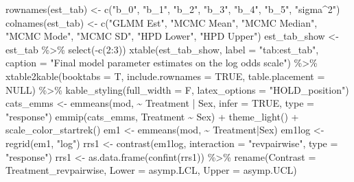 \documentclass[12pt]{article}
\newenvironment{Shaded}{\begin{snugshade}}{\end{snugshade}}
\newcommand{\AttributeTok}[1]{\textcolor[rgb]{0.77,0.63,0.00}{#1}}
\newcommand{\ConstantTok}[1]{\textcolor[rgb]{0.00,0.00,0.00}{#1}}
\newcommand{\DecValTok}[1]{\textcolor[rgb]{0.00,0.00,0.81}{#1}}
\newcommand{\FunctionTok}[1]{\textcolor[rgb]{0.00,0.00,0.00}{#1}}
\newcommand{\NormalTok}[1]{#1}
\newcommand{\OtherTok}[1]{\textcolor[rgb]{0.56,0.35,0.01}{#1}}
\newcommand{\SpecialCharTok}[1]{\textcolor[rgb]{0.00,0.00,0.00}{#1}}
\newcommand{\StringTok}[1]{\textcolor[rgb]{0.31,0.60,0.02}{#1}}
\begin{document}
\begin{Shaded}
\begin{Highlighting}[]
\FunctionTok{rownames}\NormalTok{(est\_tab) }\OtherTok{\textless{}{-}} \FunctionTok{c}\NormalTok{(}\StringTok{"b\_0"}\NormalTok{, }\StringTok{"b\_1"}\NormalTok{, }\StringTok{"b\_2"}\NormalTok{, }\StringTok{"b\_3"}\NormalTok{, }
                       \StringTok{"b\_4"}\NormalTok{, }\StringTok{"b\_5"}\NormalTok{, }\StringTok{"sigma\^{}2"}\NormalTok{)}
\FunctionTok{colnames}\NormalTok{(est\_tab) }\OtherTok{\textless{}{-}} \FunctionTok{c}\NormalTok{(}\StringTok{"GLMM Est"}\NormalTok{, }\StringTok{"MCMC Mean"}\NormalTok{, }\StringTok{"MCMC Median"}\NormalTok{, }
                       \StringTok{"MCMC Mode"}\NormalTok{, }\StringTok{"MCMC SD"}\NormalTok{, }\StringTok{"HPD Lower"}\NormalTok{, }\StringTok{"HPD Upper"}\NormalTok{)}
\NormalTok{est\_tab\_show }\OtherTok{\textless{}{-}}\NormalTok{ est\_tab }\SpecialCharTok{\%\textgreater{}\%} \FunctionTok{select}\NormalTok{(}\SpecialCharTok{{-}}\FunctionTok{c}\NormalTok{(}\DecValTok{2}\SpecialCharTok{:}\DecValTok{3}\NormalTok{))}
\FunctionTok{xtable}\NormalTok{(est\_tab\_show, }\AttributeTok{label =} \StringTok{"tab:est\_tab"}\NormalTok{, }
       \AttributeTok{caption =} \StringTok{"Final model parameter estimates on the log odds scale"}\NormalTok{) }\SpecialCharTok{\%\textgreater{}\%}
  \FunctionTok{xtable2kable}\NormalTok{(}\AttributeTok{booktabs =}\NormalTok{ T, }\AttributeTok{include.rownames =} \ConstantTok{TRUE}\NormalTok{,}
               \AttributeTok{table.placement =} \ConstantTok{NULL}\NormalTok{) }\SpecialCharTok{\%\textgreater{}\%}
  \FunctionTok{kable\_styling}\NormalTok{(}\AttributeTok{full\_width =}\NormalTok{ F, }\AttributeTok{latex\_options =} \StringTok{"HOLD\_position"}\NormalTok{) }
\NormalTok{cats\_emms }\OtherTok{\textless{}{-}} \FunctionTok{emmeans}\NormalTok{(mod, }\SpecialCharTok{\textasciitilde{}}\NormalTok{ Treatment }\SpecialCharTok{|}\NormalTok{ Sex, }\AttributeTok{infer =} \ConstantTok{TRUE}\NormalTok{, }\AttributeTok{type =} \StringTok{"response"}\NormalTok{)}
\FunctionTok{emmip}\NormalTok{(cats\_emms, Treatment }\SpecialCharTok{\textasciitilde{}}\NormalTok{ Sex) }\SpecialCharTok{+} 
  \FunctionTok{theme\_light}\NormalTok{() }\SpecialCharTok{+} \FunctionTok{scale\_color\_startrek}\NormalTok{()}
\NormalTok{em1 }\OtherTok{\textless{}{-}} \FunctionTok{emmeans}\NormalTok{(mod, }\SpecialCharTok{\textasciitilde{}}\NormalTok{ Treatment}\SpecialCharTok{|}\NormalTok{Sex)}
\NormalTok{em1log }\OtherTok{\textless{}{-}} \FunctionTok{regrid}\NormalTok{(em1, }\StringTok{"log"}\NormalTok{)}
\NormalTok{rrs1 }\OtherTok{\textless{}{-}} \FunctionTok{contrast}\NormalTok{(em1log, }\AttributeTok{interaction =} \StringTok{"revpairwise"}\NormalTok{, }\AttributeTok{type =} \StringTok{"response"}\NormalTok{)}
\NormalTok{rrs1 }\OtherTok{\textless{}{-}} \FunctionTok{as.data.frame}\NormalTok{(}\FunctionTok{confint}\NormalTok{(rrs1)) }\SpecialCharTok{\%\textgreater{}\%}
  \FunctionTok{rename}\NormalTok{(}\AttributeTok{Contrast =}\NormalTok{ Treatment\_revpairwise, }\AttributeTok{Lower =}\NormalTok{ asymp.LCL, }\AttributeTok{Upper =}\NormalTok{ asymp.UCL)}


\end{Highlighting}
\end{Shaded}
\end{document}
